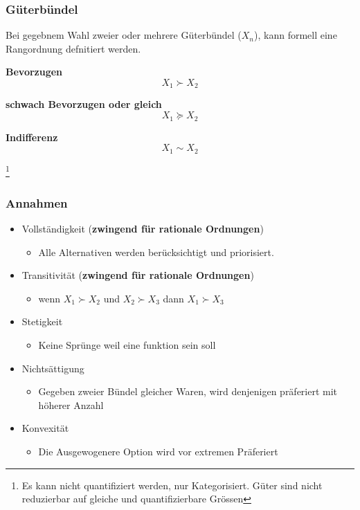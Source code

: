 \subsubsection{Güterbündel}
Bei gegebnem Wahl zweier oder mehrere Güterbündel ($X_n$), kann formell eine Rangordnung defnitiert werden.

\textbf{Bevorzugen}
\begin{equation}
    X_1 \succ X_2
\end{equation}

\textbf{schwach Bevorzugen oder gleich}
\begin{equation}
    X_1 \succeq X_2
\end{equation}

\textbf{Indifferenz}
\begin{equation}
    X_1 \sim X_2
\end{equation}

\footnote{Es kann nicht quantifiziert werden, nur Kategorisiert. Güter sind nicht reduzierbar auf gleiche und quantifizierbare Grössen}

\subsubsection{Annahmen}
\begin{itemize}
    \item Vollständigkeit (\textbf{zwingend für rationale Ordnungen})
    \begin{itemize}
        \item Alle Alternativen werden berücksichtigt und priorisiert. 
    \end{itemize}
    \item Transitivität (\textbf{zwingend für rationale Ordnungen})
    \begin{itemize}
        \item wenn $X_1 \succ X_2$ und $X_2 \succ X_3$ dann $X_1 \succ X_3$
    \end{itemize}
    \item Stetigkeit
    \begin{itemize}
        \item Keine Sprünge weil eine funktion sein soll
    \end{itemize}
    \item Nichtsättigung
    \begin{itemize}
        \item Gegeben zweier Bündel gleicher Waren, wird denjenigen präferiert mit höherer Anzahl
    \end{itemize}
    \item Konvexität
    \begin{itemize}
        \item Die Ausgewogenere Option wird vor extremen Präferiert
    \end{itemize}
\end{itemize}


